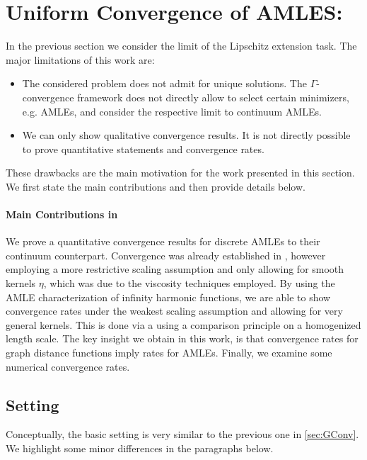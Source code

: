\section{Uniform Convergence of AMLES: \cite{bungert2021uniform}}\label{sec:UnifConv}
%
%
In the previous section we consider the limit of the Lipschitz extension task. The major limitations of this work are:
%
\begin{itemize}
\item The considered problem does not admit for unique solutions. The $\Gamma$-convergence framework does not directly allow to select certain minimizers, e.g. AMLEs, and consider the respective limit to continuum AMLEs.
%
\item We can only show qualitative convergence results. It is not directly possible to prove quantitative statements and convergence rates.
\end{itemize}
%
These drawbacks are the main motivation for the work presented in this section. We first state the main contributions and then provide details below.
%
\paragraph{Main Contributions in \cite{bungert2021uniform}} We prove a quantitative convergence results for discrete AMLEs to their continuum counterpart. Convergence was already established in \cite{calder2019consistency}, however employing a more restrictive scaling assumption and only allowing for smooth kernels $\eta$, which was due to the viscosity techniques employed. By using the AMLE characterization of infinity harmonic functions, we are able to show convergence rates under the weakest scaling assumption and allowing for very general kernels. This is done via a using a comparison principle on a homogenized length scale. The key insight we obtain in this work, is that convergence rates for graph distance functions imply rates for AMLEs. Finally, we examine some numerical convergence rates.
%
%
%
\subsection{Setting}
%
Conceptually, the basic setting is very similar to the previous one in \cref{sec:GConv}. We highlight some minor differences in the paragraphs below.
%
%
